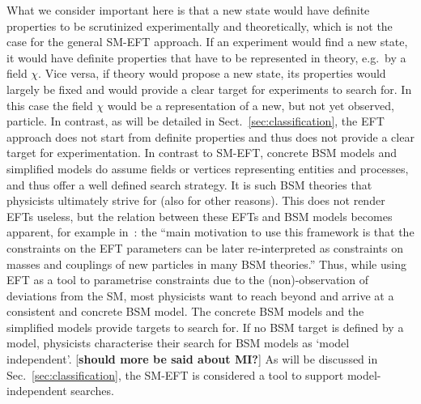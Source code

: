 What we consider important here is that a new state would have
definite properties to be scrutinized experimentally and theoretically, which is not the case for the 
general SM-EFT approach.
If an experiment would find a new state, it would have definite properties that have to be represented in theory, e.g.\ by a field $\chi $.
Vice versa, if theory would propose a new state, its properties would largely be fixed and
would provide a clear target for experiments to search for.
In this case the field $\chi $ would be a representation of a new, but
not yet observed, particle.
In contrast, as will be detailed in Sect.~\ref{sec:classification}, the EFT approach
does not start from definite properties and thus does not provide
a clear target for experimentation.  
In contrast to SM-EFT, concrete BSM models and simplified models
do assume fields or vertices representing entities and processes, and thus offer a well defined search strategy. 
It is such BSM theories that physicists ultimately strive for (also for other reasons).
This does not render EFTs useless, but the relation between these EFTs and BSM models becomes
apparent, for example in~\cite[p.~305]{deFlorian:2016spz}: the
``main motivation to use this framework is that the constraints on the EFT parameters can be {}
later re-interpreted as constraints on masses and couplings of new particles in many BSM theories.''
Thus, while using EFT as a tool to parametrise constraints due to the (non)-observation of deviations
from the SM, most physicists want to reach beyond and arrive at a consistent and concrete BSM model.
The concrete BSM models and the simplified models provide targets to search for. 
If no BSM target is defined by a model, physicists characterise their search for BSM models as `model independent'. [\textbf{should more be said about MI?}]
As will be discussed in Sec.~\ref{sec:classification}, the SM-EFT is considered a tool to support model-independent searches. 
